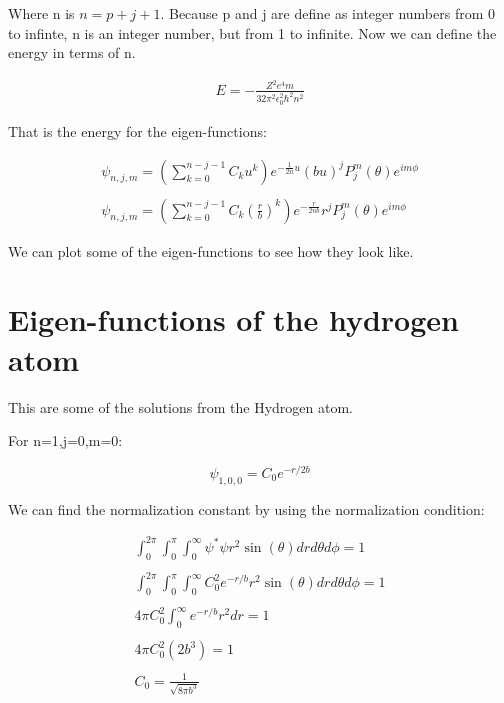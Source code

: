 Where n is $n=p+j+1$. Because p and j are define as integer numbers from 0 to infinte, n is an integer number, but from 1 to infinite. Now we can define the energy in terms of n.

\begin{equation}
  \begin{array}{c}
    E = -\frac{Z^2 e^4 m}{32\pi^2\epsilon_0^2\hbar^2 n^2}
  \end{array}
\end{equation}

That is the energy for the eigen-functions:

\begin{equation}
  \begin{array}{c}
    \psi_{n,j,m} = \left(\sum_{k=0}^{n-j-1} C_k u^k \right)e^{-\frac{1}{2n}u}(bu)^j P_j^m(\theta)e^{im\phi}
    \\

    \\
    \psi_{n,j,m} = \left(\sum_{k=0}^{n-j-1} C_k \left(\frac{r}{b}\right)^k \right)e^{-\frac{r}{2nb}}r^j P_j^m(\theta)e^{im\phi}
  \end{array}
\end{equation}

We can plot some of the eigen-functions to see how they look like.

\section{Eigen-functions of the hydrogen atom}

This are some of the solutions from the Hydrogen atom.

For n=1,j=0,m=0:

\begin{equation}
  \psi_{1,0,0} = C_0 e^{-r/2b}
\end{equation}

We can find the normalization constant by using the normalization condition:

\begin{equation}
\begin{array}{c}
  \int_{0}^{2\pi}\int_{0}^{\pi}\int_{0}^{\infty} \psi^*\psi r^2 \sin(\theta) dr d\theta d\phi = 1
  \\

  \\
  \int_{0}^{2\pi}\int_{0}^{\pi}\int_{0}^{\infty} C_0^2 e^{-r/b} r^2 \sin(\theta) dr d\theta d\phi = 1
  \\

  \\
  4 \pi C_0^2 \int_{0}^{\infty} e^{-r/b} r^2 dr = 1
  \\

  \\
  4 \pi C_0^2 (2b^3) = 1
  \\

  \\
  C_0 = \frac{1}{\sqrt{8\pi b^3}}
\end{array}
\end{equation}


